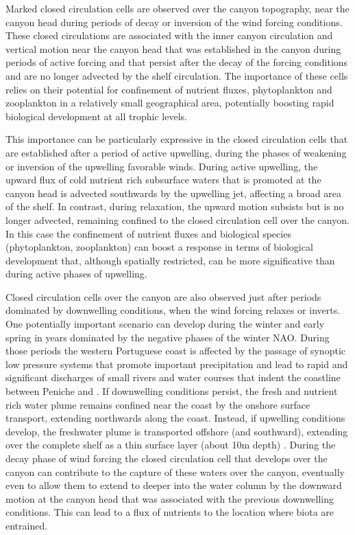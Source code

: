 Marked closed circulation cells are observed over the canyon
topography, near the canyon head during periods of decay or inversion
of the wind forcing conditions. These closed circulations are
associated with the inner canyon circulation and vertical motion near
the canyon head that was established in the canyon during periods
of active forcing and that persist after the decay of the forcing
conditions and are no longer advected by the shelf circulation. The
importance of these cells relies on their potential for confinement of
nutrient fluxes, phytoplankton and zooplankton in a relatively small
geographical area, potentially boosting rapid biological development
at all trophic levels.

This importance can be particularly expressive in the closed
circulation cells that are established after a period of active
upwelling, during the phases of weakening or inversion of the
upwelling favorable winds. During active upwelling, the upward flux of
cold nutrient rich subsurface waters that is promoted at the canyon
head is advected southwards by the upwelling jet, affecting a broad
area of the shelf. In contrast, during relaxation, the upward motion
subsists but is no longer advected, remaining confined to the closed
circulation cell over the canyon. In this case the confinement of
nutrient fluxes and biological species (phytoplankton, zooplankton)
can boost a response in terms of biological development that, although
spatially restricted, can be more significative than during active
phases of upwelling.

Closed circulation cells over the canyon are also observed just after
periods dominated by downwelling conditions, when the wind forcing
relaxes or inverts. One potentially important scenario can develop
during the winter and early spring in years dominated by the negative
phases of the winter NAO. During those periods the western Portuguese
coast is affected by the passage of synoptic low pressure systems that
promote important precipitation and lead to rapid and significant
discharges of small rivers and water courses that indent the coastline
between Peniche and \naze.  If downwelling conditions persist, the
fresh and nutrient rich water plume remains confined near the coast by
the onshore surface transport, extending northwards along the
coast. Instead, if upwelling conditions develop, the freshwater plume
is transported offshore (and southward), extending over the complete
shelf as a thin surface layer (about 10m depth)
\cite{martins10}. During the decay phase of wind forcing the closed
circulation cell that develops over the canyon can contribute to the
capture of these waters over the canyon, eventually even to allow them
to extend to deeper into the water column by the downward motion at
the canyon head that was associated with the previous downwelling
conditions. This can lead to a flux of nutrients to the location where
biota are entrained.


